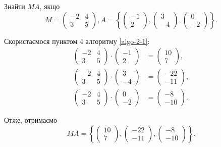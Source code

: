 \begin{problem}
	Знайти $MA$, якщо
	\[
	M=
  \begin{pmatrix}
    -2 & 4 \\
    3 & 5
  \end{pmatrix}
  , A= 
  \left\{
  \begin{pmatrix}
    -1 \\
    2 
  \end{pmatrix},
    \begin{pmatrix}
    3 \\
    -4 
  \end{pmatrix},
    \begin{pmatrix}
    0 \\
    -2 
  \end{pmatrix}
  \right\}
  .\]
\end{problem}

\begin{solution}
	Скористаємося пунктом 4 алгоритму \ref{algo-2-1}:
	\begin{align*} 
		\begin{pmatrix} -2 & 4 \\ 3 & 5 \end{pmatrix} \cdot \begin{pmatrix} -1 \\ 2 \end{pmatrix} &= \begin{pmatrix} 10 \\ 7 \end{pmatrix}, \\
		\begin{pmatrix} -2 & 4 \\ 3 & 5 \end{pmatrix} \cdot \begin{pmatrix} 3 \\ -4 \end{pmatrix} &= \begin{pmatrix} -22 \\ -11 \end{pmatrix}, \\
		\begin{pmatrix} -2 & 4 \\ 3 & 5 \end{pmatrix} \cdot \begin{pmatrix} 0 \\ -2 \end{pmatrix} &= \begin{pmatrix} -8 \\ -10 \end{pmatrix}.
	\end{align*}
  
  Отже, отримаємо \[MA = \left\{ \begin{pmatrix} 10 \\ 7 \end{pmatrix}, \begin{pmatrix} -22 \\ -11 \end{pmatrix}, \begin{pmatrix} -8 \\ -10 \end{pmatrix} \right\}.\]
\end{solution}

